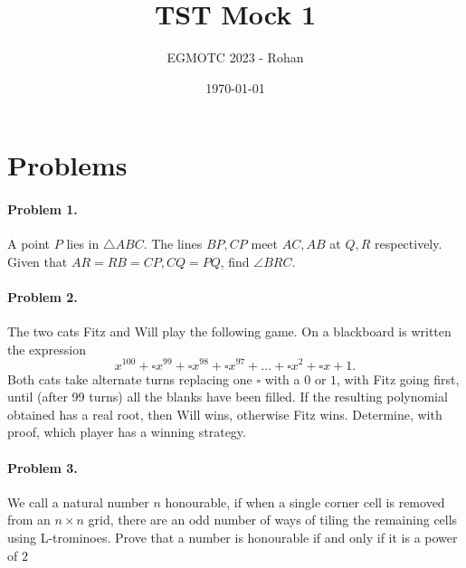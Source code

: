 \documentclass[12pt]{article}
\title{TST Mock 1}
\author{EGMOTC 2023 - Rohan}
\date{\today}
\begin{document}
\maketitle

\newcommand{\localtextbulletone}{\textcolor{black}{\raisebox{.45ex}{\rule{.6ex}{.6ex}}}}
\renewcommand{\labelitemi}{\localtextbulletone}

\section*{Problems}
\vspace{1cm}
\thispagestyle{empty}

\paragraph{\textbf{Problem 1.}} A point $P$ lies in $\triangle ABC$. The lines $BP,CP$ meet $AC,AB$ at $Q,R$ respectively. Given that $AR=RB=CP, CQ=PQ$, find $\angle BRC$. %

\paragraph{\textbf{Problem 2.}} The two cats Fitz and Will play the following game. On a blackboard is written the expression
\[ 
  x^{100} + {\square} x^{99} + {\square} x^{98} + {\square} x^{97} + \dots + {\square } x^2 + {\square} x +1. 
\]Both cats take alternate turns replacing one $\square$ with a $0$ or $1$, with Fitz going first, until (after 99 turns) all the blanks have been filled. If the resulting polynomial obtained has a real root, then Will wins, otherwise Fitz wins. Determine, with proof, which player has a winning strategy.

\paragraph{\textbf{Problem 3.}} We call a natural number $n$ honourable, if when a single corner cell is removed from an $n \times n$ grid, there are an odd number of ways of tiling the remaining cells using L-trominoes. Prove that a number is honourable if and only if it is a power of $2$
\end{document}
